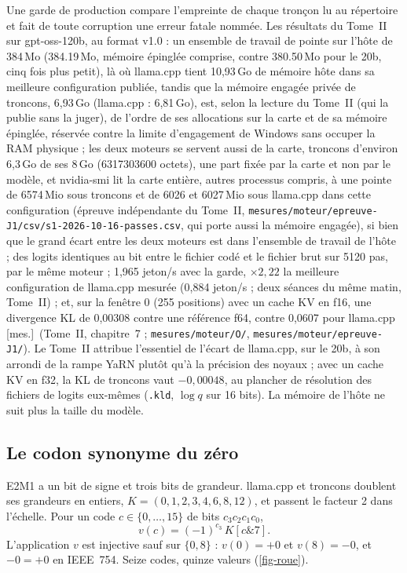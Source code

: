 \documentclass[11pt, a4paper]{article}
\theoremstyle{remark}
\newcommand{\etiq}[1]{\textsf{\scriptsize[#1]}}
\newcommand{\mes}{\etiq{mes.}}
\newcommand{\fichier}[1]{\textsf{\footnotesize\nolinkurl{#1}}}
\begin{document}
Une garde de production compare l'empreinte de chaque tronçon lu au répertoire et fait de toute corruption une erreur fatale nommée. Les résultats du Tome~II sur gpt-oss-120b, au format v1.0 : un ensemble de travail de pointe sur l'hôte de 384\,Mo (\num{384,19}\,Mo, mémoire épinglée comprise, contre \num{380,50}\,Mo pour le 20b, cinq fois plus petit), là où llama.cpp tient 10,93\,Go de mémoire hôte dans sa meilleure configuration publiée, tandis que la mémoire engagée privée de troncons, 6,93\,Go (llama.cpp : 6,81\,Go), est, selon la lecture du Tome~II (qui la publie sans la juger), de l'ordre de ses allocations sur la carte et de sa mémoire épinglée, réservée contre la limite d'engagement de Windows sans occuper la RAM physique ; les deux moteurs se servent aussi de la carte, troncons d'environ 6,3\,Go de ses 8\,Go (\num{6317303600} octets), une part fixée par la carte et non par le modèle, et nvidia-smi lit la carte entière, autres processus compris, à une pointe de \num{6574}\,Mio sous troncons et de \num{6026} et \num{6027}\,Mio sous llama.cpp dans cette configuration (épreuve indépendante du Tome~II, \fichier{mesures/moteur/epreuve-J1/csv/s1-2026-10-16-passes.csv}, qui porte aussi la mémoire engagée), si bien que le grand écart entre les deux moteurs est dans l'ensemble de travail de l'hôte ; des logits identiques au bit entre le fichier codé et le fichier brut sur \num{5120} pas, par le même moteur ; 1,965 jeton/s avec la garde, $\times 2{,}22$ la meilleure configuration de llama.cpp mesurée (0,884 jeton/s ; deux séances du même matin, Tome~II) ; et, sur la fenêtre 0 (255 positions) avec un cache KV en f16, une divergence KL de 0,00308 contre une référence f64, contre 0,0607 pour llama.cpp \mes~(Tome~II, chapitre~7 ; \fichier{mesures/moteur/O/}, \fichier{mesures/moteur/epreuve-J1/}). Le Tome~II attribue l'essentiel de l'écart de llama.cpp, sur le 20b, à son arrondi de la rampe YaRN \citep{peng2023yarn} plutôt qu'à la précision des noyaux ; avec un cache KV en f32, la KL de troncons vaut $-0{,}00048$, au plancher de résolution des fichiers de logits eux-mêmes (\texttt{.kld}, $\log q$ sur 16 bits). La mémoire de l'hôte ne suit plus la taille du modèle.

\subsection{Le codon synonyme du zéro}\label{sec-codon}

E2M1 a un bit de signe et trois bits de grandeur. llama.cpp et troncons doublent ses grandeurs en entiers, $K = (0, 1, 2, 3, 4, 6, 8, 12)$, et passent le facteur 2 dans l'échelle. Pour un code $c \in \{0, \dots, 15\}$ de bits $c_3c_2c_1c_0$,
\begin{equation}\label{eq-valeur}
v(c) = (-1)^{c_3}\,K[c \mathbin{\&} 7].
\end{equation}
L'application $v$ est injective sauf sur $\{0, 8\}$ : $v(0) = +0$ et $v(8) = -0$, et $-0 = +0$ en IEEE~754. Seize codes, quinze valeurs (\cref{fig-roue}).
\end{document}
